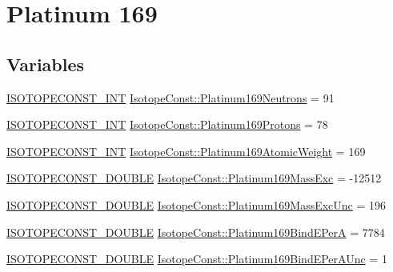 \hypertarget{group___isotope_const-_platinum-_pt169}{}\section{Platinum 169}
\label{group___isotope_const-_platinum-_pt169}
\subsection*{Variables}
\begin{DoxyCompactItemize}
\item 
\mbox{\hyperlink{group___isotope_const-_macros_ga5f18360b3e99483a35c32d789e62621c}{I\+S\+O\+T\+O\+P\+E\+C\+O\+N\+S\+T\+\_\+\+I\+NT}} \mbox{\hyperlink{group___isotope_const-_platinum-_pt169_ga46794861398ebc8f1b7837855e9a9274}{Isotope\+Const\+::\+Platinum169\+Neutrons}} = 91
\item 
\mbox{\hyperlink{group___isotope_const-_macros_ga5f18360b3e99483a35c32d789e62621c}{I\+S\+O\+T\+O\+P\+E\+C\+O\+N\+S\+T\+\_\+\+I\+NT}} \mbox{\hyperlink{group___isotope_const-_platinum-_pt169_ga570c5eb523558212f092f83aceb8a624}{Isotope\+Const\+::\+Platinum169\+Protons}} = 78
\item 
\mbox{\hyperlink{group___isotope_const-_macros_ga5f18360b3e99483a35c32d789e62621c}{I\+S\+O\+T\+O\+P\+E\+C\+O\+N\+S\+T\+\_\+\+I\+NT}} \mbox{\hyperlink{group___isotope_const-_platinum-_pt169_ga5dc97e47ebaf21f13dfd0d5019557af8}{Isotope\+Const\+::\+Platinum169\+Atomic\+Weight}} = 169
\item 
\mbox{\hyperlink{group___isotope_const-_macros_ga8f45a7272ce02c0b4c65c44636ed719a}{I\+S\+O\+T\+O\+P\+E\+C\+O\+N\+S\+T\+\_\+\+D\+O\+U\+B\+LE}} \mbox{\hyperlink{group___isotope_const-_platinum-_pt169_ga830d3ced761a766a733f58d576255e17}{Isotope\+Const\+::\+Platinum169\+Mass\+Exc}} = -\/12512
\item 
\mbox{\hyperlink{group___isotope_const-_macros_ga8f45a7272ce02c0b4c65c44636ed719a}{I\+S\+O\+T\+O\+P\+E\+C\+O\+N\+S\+T\+\_\+\+D\+O\+U\+B\+LE}} \mbox{\hyperlink{group___isotope_const-_platinum-_pt169_gafb68d9b17db6ed7bd12b4ea9d697e654}{Isotope\+Const\+::\+Platinum169\+Mass\+Exc\+Unc}} = 196
\item 
\mbox{\hyperlink{group___isotope_const-_macros_ga8f45a7272ce02c0b4c65c44636ed719a}{I\+S\+O\+T\+O\+P\+E\+C\+O\+N\+S\+T\+\_\+\+D\+O\+U\+B\+LE}} \mbox{\hyperlink{group___isotope_const-_platinum-_pt169_gafeba8d33be2608aae987e9778b00c48f}{Isotope\+Const\+::\+Platinum169\+Bind\+E\+PerA}} = 7784
\item 
\mbox{\hyperlink{group___isotope_const-_macros_ga8f45a7272ce02c0b4c65c44636ed719a}{I\+S\+O\+T\+O\+P\+E\+C\+O\+N\+S\+T\+\_\+\+D\+O\+U\+B\+LE}} \mbox{\hyperlink{group___isotope_const-_platinum-_pt169_ga6c6636b5a99463bebdade536b0c9bca6}{Isotope\+Const\+::\+Platinum169\+Bind\+E\+Per\+A\+Unc}} = 1

\end{DoxyCompactItemize}
